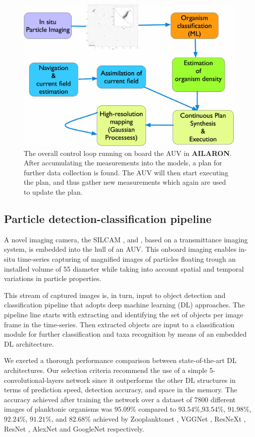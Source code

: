\documentclass[conference]{IEEEtran}
\def\proje{{\textbf{AILARON}}}
\begin{document}
\begin{figure}[tbp]
\centerline{\includegraphics[width=0.8\linewidth]{figures/workflow-simplified.jpg}}
\caption{The overall control loop running on board the AUV in \proje. After accumulating the measurements into the models, a plan for further data collection is found. The AUV will then start executing the plan, and thus gather new measurements which again are used to update the plan.}
\label{fig:sensePlanActLoop}
\end{figure}

\subsection{Particle detection-classification pipeline}
A novel imaging camera, the SILCAM \cite{Davies2017a}, and \cite{Davies2017b}, based on a transmittance imaging system, is embedded into the hull of an AUV. This onboard imaging enables in-situ time-series capturing of magnified images of particles floating trough an installed volume of \si{55}{\micro\meter} diameter while taking into account spatial and temporal variations in particle properties.

This stream of captured images is, in turn, input to object detection and classification pipeline that adopts deep machine learning (DL) approaches. The pipeline line starts with extracting and identifying the set of objects per image frame in the time-series. Then extracted objects are input to a classification module for further classification and taxa recognition by means of an embedded DL architecture. 

We exerted a thorough performance comparison between state-of-the-art DL architectures. Our selection criteria recommend the use of a simple 5-convolutional-layers network since it outperforms the other DL structures in terms of prediction speed, detection accuracy, and space in the memory. The accuracy achieved after training the network over a dataset of 7800 different images of planktonic organisms was $95.09\%$ compared to $93.54\%$,$93.54\%$, $91.98\%$, $92.24\%$, $91.21\%$, and $82.68\%$ achieved by Zooplanktonet \cite{dai2016zooplanktonet}, VGGNet \cite{simonyan2014very}, ResNeXt \cite{xie2017aggregated}, ResNet  \cite{he2016deep}, AlexNet \cite{krizhevsky2012imagenet} and GoogleNet  \cite{szegedy2015going} respectively. 
\end{document}
